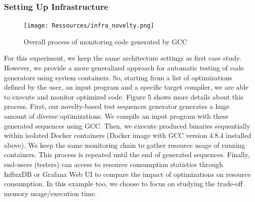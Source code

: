 \subsubsection{Setting Up Infrastructure}
\begin{figure}[b]
	\centering
	\texttt{[image: Ressources/infra\_novelty.png]}
	\caption{Overall process of monitoring code generated by GCC}
	
	
\end{figure}
For this experiment, we keep the same architecture settings as first case study. However, we provide a more generalized approach for automatic testing of code generators using system containers. So, starting from a list of optimizations defined by the user, an input program and a specific target compiler, we are able to execute and monitor optimized code. Figure 5 shows more details about this process. First, our novelty-based test sequences generator generates a huge amount of diverse optimizations. We compile an input program with these generated sequences using GCC. Then, we execute produced binaries sequentially within isolated Docker containers (Docker image with GCC version 4.8.4 installed above). We keep the same monitoring chain to gather resource usage of running containers. This process is repeated until the end of generated sequences. Finally, end-users (testers) can access to resource consumption statistics through InfluxDB or Grafana Web UI to compare the impact of optimizations on resource consumption. In this example too, we choose to focus on studying the trade-off memory usage/execution time. 
